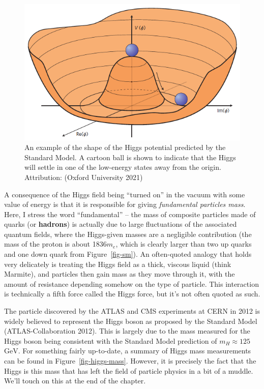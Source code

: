 \documentclass[
  11pt,
  numbers=noendperiod]{book}
\begin{document}
\begin{figure}

{\centering \includegraphics{./images/higgspotential.png}

}

\caption{\label{fig-higgs-potential}An example of the shape of the Higgs
potential predicted by the Standard Model. A cartoon ball is shown to
indicate that the Higgs will settle in one of the low-energy states away
from the origin. Attribution: (Oxford University 2021)}

\end{figure}

A consequence of the Higgs field being ``turned on'' in the vacuum with
some value of energy is that it is responsible for giving
\emph{fundamental particles mass}. Here, I stress the word
``fundamental'' -- the mass of composite particles made of quarks (or
\textbf{hadrons}) is actually due to large fluctuations of the
associated quantum fields, where the Higgs-given masses are a negligible
contribution (the mass of the proton is about 1836\(m_e\), which is
clearly larger than two up quarks and one down quark from
Figure~\ref{fig-sm}). An often-quoted analogy that holds very delicately
is treating the Higgs field as a thick, viscous liquid (think Marmite),
and particles then gain mass as they move through it, with the amount of
resistance depending somehow on the type of particle. This interaction
is technically a fifth force called the Higgs force, but it's not often
quoted as such.

The particle discovered by the ATLAS and CMS experiments at CERN in 2012
is widely believed to represent the Higgs boson as proposed by the
Standard Model (ATLAS-Collaboration 2012). This is largely due to the
mass measured for the Higgs boson being consistent with the Standard
Model prediction of \(m_H \approx 125\) \(\text{GeV}\). For something
fairly up-to-date, a summary of Higgs mass measurements can be found in
Figure~\ref{fig-higgs-mass}. However, it is precisely the fact that the
Higgs is this mass that has left the field of particle physics in a bit
of a muddle. We'll touch on this at the end of the chapter.
\end{document}
